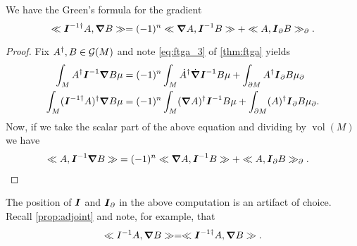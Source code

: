 \begin{theorem}
\label{thm:multivector_greens_formula}
We have the Green's formula for the gradient
\begin{equation}
\ll \boldsymbol{I}^{-1 \dagger} A, \boldsymbol{\nabla} B\gg = (-1)^n \ll \boldsymbol{\nabla} A, \boldsymbol{I}^{-1} B\gg + \ll A, \boldsymbol{I}_\partial B\gg_\partial.
\end{equation}
\end{theorem}
\begin{proof}
Fix $A^\dagger,B \in \mathcal{G}(M)$ and note \cref{eq:ftga_3} of \cref{thm:ftga} yields
\begin{align}
\int_M A^\dagger \boldsymbol{I}^{-1} \boldsymbol{\nabla} B\mu &= (-1)^{n} \int_M \dot{A}^\dagger\dot{\boldsymbol{\nabla}} \boldsymbol{I}^{-1} B \mu +  \int_{\partial M} A^\dagger \boldsymbol{I}_\partial B \mu_\partial\\
\int_M (\boldsymbol{I}^{-1 \dagger} A)^\dagger \boldsymbol{\nabla} B \mu &= (-1)^n \int_M (\boldsymbol{\nabla} A)^\dagger \boldsymbol{I}^{-1} B \mu + \int_{\partial M} (A)^\dagger \boldsymbol{I}_\partial B \mu_\partial.
\end{align}
Now, if we take the scalar part of the above equation and dividing by $\operatorname{vol}(M)$ we have
\begin{align}
\ll A, \boldsymbol{I}^{-1} \boldsymbol{\nabla} B\gg &= (-1)^n \ll \boldsymbol{\nabla} A, \boldsymbol{I}^{-1} B\gg + \ll A, \boldsymbol{I}_\partial B\gg_\partial.
\end{align}

\end{proof}
\begin{remark}
The position of $\boldsymbol{I}$ and $\boldsymbol{I}_\partial$ in the above computation is an artifact of choice. Recall \cref{prop:adjoint} and note, for example, that
\begin{equation}
\ll I^{-1}A, \boldsymbol{\nabla} B\gg = \ll \boldsymbol{I}^{-1 \dagger}A, \boldsymbol{\nabla}{B}\gg.
\end{equation}
\end{remark}

